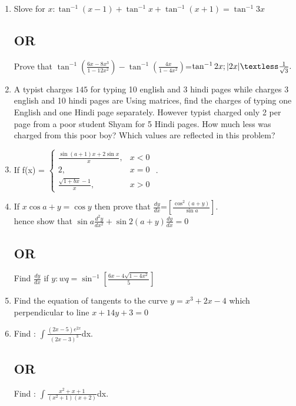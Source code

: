\documentclass{article}
\begin{document}
\begin{enumerate}
	\item Slove for $x:\tan^{-1}(x-1)+\tan^{-1} x+\tan^{-1}(x+1)=\tan^{-1}3x$\\
		\subsection*{\centering OR}
		Prove that $\tan^{-1}(\frac{6x-8x^3}{1-12x^2})-\tan^{-1}(\frac{4x}{1-4x^2})$=$\tan^{-1}2x;|2x|\textless\frac{1}{\sqrt{3}}.$
	\item A typist charges \rupee $145$ for typing 10 english and 3 hindi pages while charges 3 english and 10 hindi pages are  Using matrices, find the charges of typing one English and one Hindi page separately. However typist charged only 2 per page from a poor student Shyam for 5 Hindi pages. How much less was charged from this poor boy? Which values are reflected in this problem?

	\item  If  f(x) = $\begin{cases}
\frac{\sin(a+1)x + 2\sin x}{x}, & x < 0 \\
   2, & x = 0 \\
   \frac{\sqrt{1+bx} - 1}{x}, & x > 0
    \end{cases}$
	.
	
\item If $x\cos{a+y}=\cos{y}$ then prove that $\frac{dy}{dx}$=$[\frac{\cos^2(a+y)}{\sin a}]$.\\
		hence show that $\sin a\frac{d^{2}y}{dx^2}+\sin 2(a+y)\frac{dy}{dx}=0$

      \subsection*{\centering OR}

		Find $\frac{dy}{dx}$ if $y:wq=\sin^{-1}[\frac{6x-4\sqrt{1-4x^2}}{5}]$
	\item Find the equation of tangents to the curve $y = x ^ 3 + 2x - 4$ which perpendicular to line $x + 14y + 3 = 0$
	
	\item Find : $\int\frac{(2x-5)e^{2x}}{(2x-3)^3}$dx.

		\subsection*{\centering OR}

		Find : $\int\frac{x^2+x+1}{(x^{2}+1)(x+2)}$dx.


\end{enumerate}
\end{document}
